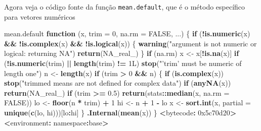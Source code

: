 \documentclass[10pt,a4paper]{book}
\newenvironment{Shaded}{\begin{snugshade}}{\end{snugshade}}
\newcommand{\KeywordTok}[1]{\textcolor[rgb]{0.13,0.29,0.53}{\textbf{#1}}}
\newcommand{\DataTypeTok}[1]{\textcolor[rgb]{0.13,0.29,0.53}{#1}}
\newcommand{\DecValTok}[1]{\textcolor[rgb]{0.00,0.00,0.81}{#1}}
\newcommand{\FloatTok}[1]{\textcolor[rgb]{0.00,0.00,0.81}{#1}}
\newcommand{\StringTok}[1]{\textcolor[rgb]{0.31,0.60,0.02}{#1}}
\newcommand{\OtherTok}[1]{\textcolor[rgb]{0.56,0.35,0.01}{#1}}
\newcommand{\ControlFlowTok}[1]{\textcolor[rgb]{0.13,0.29,0.53}{\textbf{#1}}}
\newcommand{\OperatorTok}[1]{\textcolor[rgb]{0.81,0.36,0.00}{\textbf{#1}}}
\newcommand{\ErrorTok}[1]{\textcolor[rgb]{0.64,0.00,0.00}{\textbf{#1}}}
\newcommand{\NormalTok}[1]{#1}
\begin{document}
Agora veja o código fonte da função \texttt{mean.default}, que é o
método específico para vetores numéricos

\begin{Shaded}
\begin{Highlighting}[]
\NormalTok{mean.default}
\ControlFlowTok{function}\NormalTok{ (x, }\DataTypeTok{trim =} \DecValTok{0}\NormalTok{, }\DataTypeTok{na.rm =} \OtherTok{FALSE}\NormalTok{, ...) }
\NormalTok{\{}
    \ControlFlowTok{if}\NormalTok{ (}\OperatorTok{!}\KeywordTok{is.numeric}\NormalTok{(x) }\OperatorTok{&&}\StringTok{ }\OperatorTok{!}\KeywordTok{is.complex}\NormalTok{(x) }\OperatorTok{&&}\StringTok{ }\OperatorTok{!}\KeywordTok{is.logical}\NormalTok{(x)) \{}
        \KeywordTok{warning}\NormalTok{(}\StringTok{"argument is not numeric or logical: returning NA"}\NormalTok{)}
        \KeywordTok{return}\NormalTok{(}\OtherTok{NA_real_}\NormalTok{)}
\NormalTok{    \}}
    \ControlFlowTok{if}\NormalTok{ (na.rm) }
\NormalTok{        x <-}\StringTok{ }\NormalTok{x[}\OperatorTok{!}\KeywordTok{is.na}\NormalTok{(x)]}
    \ControlFlowTok{if}\NormalTok{ (}\OperatorTok{!}\KeywordTok{is.numeric}\NormalTok{(trim) }\OperatorTok{||}\StringTok{ }\KeywordTok{length}\NormalTok{(trim) }\OperatorTok{!=}\StringTok{ }\NormalTok{1L) }
        \KeywordTok{stop}\NormalTok{(}\StringTok{"'trim' must be numeric of length one"}\NormalTok{)}
\NormalTok{    n <-}\StringTok{ }\KeywordTok{length}\NormalTok{(x)}
    \ControlFlowTok{if}\NormalTok{ (trim }\OperatorTok{>}\StringTok{ }\DecValTok{0} \OperatorTok{&&}\StringTok{ }\NormalTok{n) \{}
        \ControlFlowTok{if}\NormalTok{ (}\KeywordTok{is.complex}\NormalTok{(x)) }
            \KeywordTok{stop}\NormalTok{(}\StringTok{"trimmed means are not defined for complex data"}\NormalTok{)}
        \ControlFlowTok{if}\NormalTok{ (}\KeywordTok{anyNA}\NormalTok{(x)) }
            \KeywordTok{return}\NormalTok{(}\OtherTok{NA_real_}\NormalTok{)}
        \ControlFlowTok{if}\NormalTok{ (trim }\OperatorTok{>=}\StringTok{ }\FloatTok{0.5}\NormalTok{) }
            \KeywordTok{return}\NormalTok{(stats}\OperatorTok{::}\KeywordTok{median}\NormalTok{(x, }\DataTypeTok{na.rm =} \OtherTok{FALSE}\NormalTok{))}
\NormalTok{        lo <-}\StringTok{ }\KeywordTok{floor}\NormalTok{(n }\OperatorTok{*}\StringTok{ }\NormalTok{trim) }\OperatorTok{+}\StringTok{ }\DecValTok{1}
\NormalTok{        hi <-}\StringTok{ }\NormalTok{n }\OperatorTok{+}\StringTok{ }\DecValTok{1} \OperatorTok{-}\StringTok{ }\NormalTok{lo}
\NormalTok{        x <-}\StringTok{ }\KeywordTok{sort.int}\NormalTok{(x, }\DataTypeTok{partial =} \KeywordTok{unique}\NormalTok{(}\KeywordTok{c}\NormalTok{(lo, hi)))[lo}\OperatorTok{:}\NormalTok{hi]}
\NormalTok{    \}}
    \KeywordTok{.Internal}\NormalTok{(}\KeywordTok{mean}\NormalTok{(x))}
\NormalTok{\}}
\OperatorTok{<}\NormalTok{bytecode}\OperatorTok{:}\StringTok{ }\DecValTok{0x5c70d20}\OperatorTok{>}
\ErrorTok{<}\NormalTok{environment}\OperatorTok{:}\StringTok{ }\NormalTok{namespace}\OperatorTok{:}\NormalTok{base}\OperatorTok{>}
\end{Highlighting}
\end{Shaded}
\end{document}
